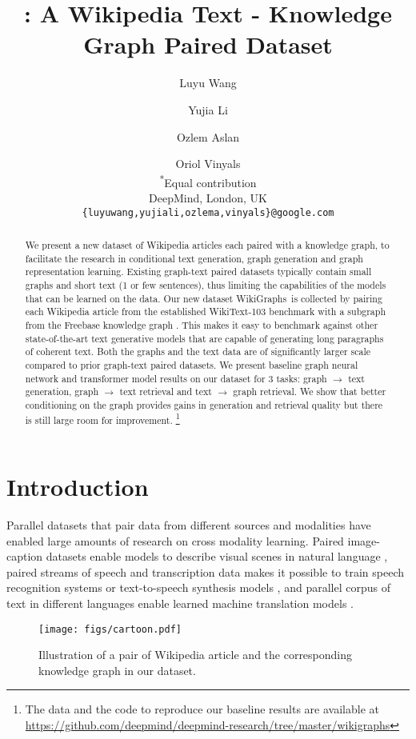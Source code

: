 \documentclass[11pt]{article}
\title{\ourdataset: A Wikipedia Text - Knowledge Graph Paired Dataset}
\author{Luyu Wang\textsuperscript{\normalfont{*}}\and Yujia Li\textsuperscript{\normalfont{*}}\and Ozlem Aslan\and Oriol Vinyals \\
  \textsuperscript{*}Equal contribution \\
  DeepMind, London, UK \\
  \texttt{\{luyuwang,yujiali,ozlema,vinyals\}@google.com}
}
\newcommand{\ourdataset}{{WikiGraphs}}
\begin{document}
\maketitle
\begin{abstract}
We present a new dataset of Wikipedia articles each paired with a knowledge graph, to facilitate the research in conditional text generation, graph generation and graph representation learning.  Existing graph-text paired datasets typically contain small graphs and short text (1 or few sentences), thus limiting the capabilities of the models that can be learned on the data.  Our new dataset \ourdataset~is collected by pairing each Wikipedia article from the established WikiText-103 benchmark \cite{merity2016pointer} with a subgraph from the Freebase knowledge graph \cite{bollacker2008freebase}.  This makes it easy to benchmark against other state-of-the-art text generative models that are capable of generating long paragraphs of coherent text.  Both the graphs and the text data are of significantly larger scale compared to prior graph-text paired datasets. We present baseline graph neural network and transformer model results on our dataset for 3 tasks: graph $\rightarrow$ text generation, graph $\rightarrow$ text retrieval and text $\rightarrow$ graph retrieval. We show that better conditioning on the graph provides gains in generation and retrieval quality but there is still large room for improvement.
\footnote{The data and the code to reproduce our baseline results are available at \url{https://github.com/deepmind/deepmind-research/tree/master/wikigraphs}}
\end{abstract}

\section{Introduction}


Parallel datasets that pair data from different sources and modalities have enabled large amounts of research on cross modality learning.  Paired image-caption datasets enable models to describe visual scenes in natural language \cite{lin2014microsoft,vinyals2016show}, paired streams of speech and transcription data makes it possible to train speech recognition systems \cite{garofolo1993darpa,panayotov2015librispeech} or text-to-speech synthesis models \cite{oord2016wavenet},
and parallel corpus of text in different languages enable learned machine translation models \cite{barrault2020findings}.

\begin{figure}[t]
    \centering
\texttt{[image: figs/cartoon.pdf]}
    \caption{Illustration of a pair of Wikipedia article and the corresponding knowledge graph in our dataset.
}
    \label{fig:cartoon-example}
\end{figure}
\end{document}
